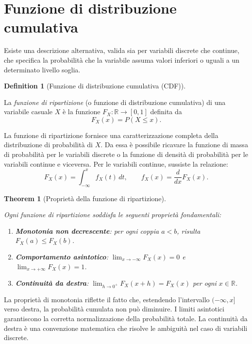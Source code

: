 \documentclass[
  letterpaper,
  DIV=11,
  numbers=noendperiod,
  oneside]{scrreprt}
\providecommand{\tightlist}{%
  \setlength{\itemsep}{0pt}\setlength{\parskip}{0pt}}
\theoremstyle{definition}
\theoremstyle{plain}
\newtheorem{theorem}{Theorem}[chapter]
\theoremstyle{definition}
\newtheorem{definition}{Definition}[chapter]
\theoremstyle{remark}
\begin{document}
\section{Funzione di distribuzione
cumulativa}\label{funzione-di-distribuzione-cumulativa}

Esiste una descrizione alternativa, valida sia per variabili discrete
che continue, che specifica la probabilità che la variabile assuma
valori inferiori o uguali a un determinato livello soglia.

\begin{definition}[Funzione di distribuzione cumulativa
(CDF)]\protect\hypertarget{def-cdf}{}\label{def-cdf}

La \emph{funzione di ripartizione} (o funzione di distribuzione
cumulativa) di una variabile casuale \(X\) è la funzione
\(F_X : \mathbb{R} \to [0,1]\) definita da \[
F_X(x) = P(X \leq x).
\]

\end{definition}

La funzione di ripartizione fornisce una caratterizzazione completa
della distribuzione di probabilità di \(X\). Da essa è possibile
ricavare la funzione di massa di probabilità per le variabili discrete o
la funzione di densità di probabilità per le variabili continue e
viceversa. Per le variabili continue, sussiste la relazione: \[
F_X(x) = \int_{-\infty}^{x} f_X(t) \, dt, \qquad f_X(x) = \frac{d}{dx} F_X(x).
\]

\begin{theorem}[Proprietà della funzione di
ripartizione]\protect\hypertarget{thm-cdf-properties}{}\label{thm-cdf-properties}

Ogni funzione di ripartizione soddisfa le seguenti proprietà
fondamentali:

\begin{enumerate}
\def\labelenumi{\arabic{enumi}.}
\tightlist
\item
  \textbf{Monotonia non decrescente}: per ogni coppia \(a < b\), risulta
  \(F_X(a) \leq F_X(b)\).
\item
  \textbf{Comportamento asintotico}: \(\lim_{x \to -\infty} F_X(x) = 0\)
  e \(\lim_{x \to +\infty} F_X(x) = 1\).
\item
  \textbf{Continuità da destra}:
  \(\lim_{h \to 0^+} F_X(x + h) = F_X(x)\) per ogni
  \(x \in \mathbb{R}\).
\end{enumerate}

\end{theorem}

La proprietà di monotonia riflette il fatto che, estendendo l'intervallo
\((-\infty, x]\) verso destra, la probabilità cumulata non può
diminuire. I limiti asintotici garantiscono la corretta normalizzazione
della probabilità totale. La continuità da destra è una convenzione
matematica che risolve le ambiguità nel caso di variabili discrete.
\end{document}
